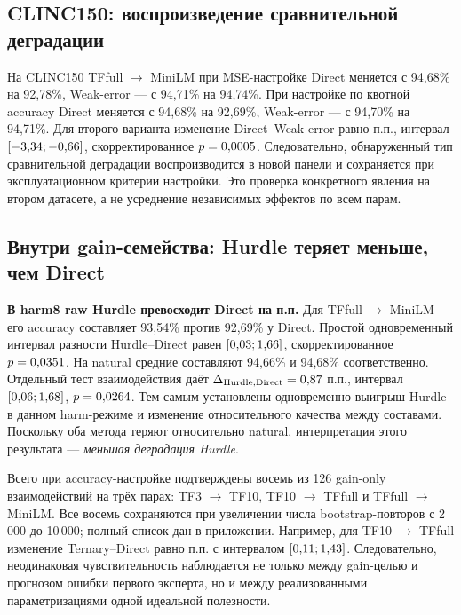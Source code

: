 \subsection{CLINC150: воспроизведение сравнительной деградации}
На CLINC150 TFfull $\to$ MiniLM при MSE-настройке Direct меняется
с 94,68\% на 92,78\%, Weak-error --- с 94,71\% на 94,74\%.
При настройке по квотной accuracy Direct меняется с 94,68\%
на 92,69\%, Weak-error --- с 94,70\% на 94,71\%.
Для второго варианта изменение Direct--Weak-error равно
\ClincShiftEffect{} п.п., интервал $[-3{,}34; -0{,}66]$,
скорректированное $p=0{,}0005$.
Следовательно, обнаруженный тип сравнительной деградации
воспроизводится в новой панели и сохраняется при эксплуатационном
критерии настройки. Это проверка конкретного явления на втором
датасете, а не усреднение независимых эффектов по всем парам.

\begin{table}[htbp]\centering\small
\caption{CLINC150, TFfull $\to$ MiniLM: средняя accuracy,
accuracy-настройка, fit1000, квота20\%, 20 обучений.}
\label{tab:clinc_extended}

\end{table}

\subsection{Внутри gain-семейства: Hurdle теряет меньше, чем Direct}
\textbf{В harm8 raw Hurdle превосходит Direct на
\HurdleSimpleEffect{} п.п.} Для TFfull $\to$ MiniLM
его accuracy составляет 93,54\% против 92,69\% у Direct.
Простой одновременный интервал разности Hurdle--Direct равен
$[0{,}03; 1{,}66]$, скорректированное $p=0{,}0351$.
На natural средние составляют 94,66\% и 94,68\% соответственно.
Отдельный тест взаимодействия даёт
$\Delta_{\mathrm{Hurdle,Direct}}=0{,}87$ п.п.,
интервал $[0{,}06; 1{,}68]$, $p=0{,}0264$.
Тем самым установлены одновременно выигрыш Hurdle в данном
harm-режиме и изменение относительного качества между составами.
Поскольку оба метода теряют относительно natural, интерпретация
этого результата --- \emph{меньшая деградация Hurdle}.

Всего при accuracy-настройке подтверждены восемь из 126
gain-only взаимодействий на трёх парах: TF3 $\to$ TF10,
TF10 $\to$ TFfull и TFfull $\to$ MiniLM.
Все восемь сохраняются при увеличении числа bootstrap-повторов
с 2\,000 до 10\,000; полный список дан в приложении.
Например, для TF10 $\to$ TFfull изменение Ternary--Direct
равно \TernaryShiftEffect{} п.п. с интервалом $[0{,}11; 1{,}43]$.
Следовательно, неодинаковая чувствительность наблюдается
не только между gain-целью и прогнозом ошибки первого эксперта,
но и между реализованными параметризациями одной идеальной полезности.


